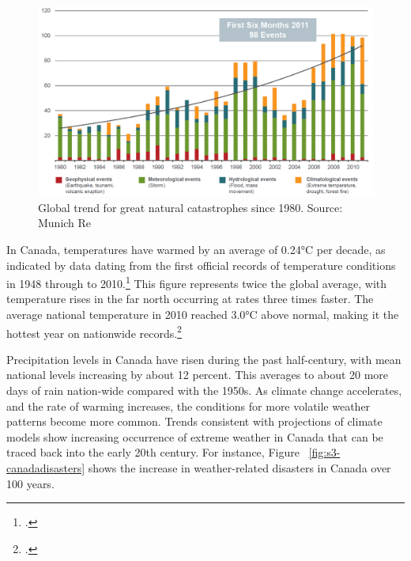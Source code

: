 \begin{figure}
\includegraphics[width=160mm]{s3-munich-cat.png}
\centering
\caption{Global trend for great natural catastrophes since 1980. Source: Munich Re}
\label{fig:s3-munich-cat}
\end{figure}



In Canada, temperatures have warmed by an average of 0.24°C per decade, as indicated by data dating from the first official records of temperature conditions in 1948 through to 2010.\footcite[][p. 13]{TellingWeatherStory}
This figure represents twice the global average, with temperature rises in the far north occurring at rates three times faster. 
The average national temperature in 2010 reached 3.0°C above normal, making it the hottest year on nationwide records.\footcite[][p. 13]{TellingWeatherStory}



Precipitation levels in Canada have risen during the past half-century, with mean national levels increasing by about 12 percent. 
This averages to about 20 more days of rain nation-wide compared with the 1950s. 
As climate change accelerates, and the rate of warming increases, the conditions for more volatile weather patterns become more common. 
Trends consistent with projections of climate models show increasing occurrence of extreme weather in Canada that can be traced back into the early 20th century. 
For instance, Figure ~\ref{fig:s3-canadadisasters} shows the increase in weather-related disasters in Canada over 100 years.



